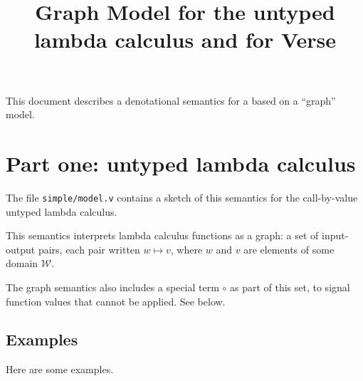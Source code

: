 \documentclass{article}
\title{Graph Model for the untyped lambda calculus and for 
Verse}
\theoremstyle{definition}
\begin{document}
\maketitle

This document describes a denotational semantics for a
based on a ``graph'' model. 

\newcommand\inhabited[1]{\ensuremath{\mathit{inhabited}}\ {#1}}
\newcommand\apply[2]{\ensuremath{{#1}\ \blacksquare\ {#2}}}

\section{Part one: untyped lambda calculus}


The file \texttt{simple/model.v} contains a sketch of this semantics for the
call-by-value untyped lambda calculus.

This semantics interprets lambda calculus functions as a graph: a set of
input-output pairs, each pair written $w \mapsto v$, where $w$ and $v$
are elements of some domain $\mathcal{W}$. 

The graph semantics also includes a special term $\circ$ as part of this set,
to signal function values that cannot be applied. See below.

\subsection{Examples}

Here are some examples.
\end{document}
